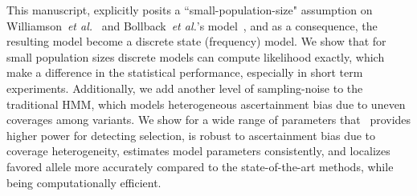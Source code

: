 This manuscript, explicitly posits a ``small-population-size" assumption on 
Williamson~\emph{et al.}~\cite{williamson1999using} and Bollback~\emph{et 
al.}'s model~\cite{bollback2008estimation}, and as a consequence, the 
resulting model become a discrete state (frequency) model. 
We show that for small population sizes discrete models can compute 
likelihood exactly, which make a difference in the statistical performance, 
especially in short term 
experiments. Additionally, we add another level of sampling-noise to the 
traditional HMM, which models heterogeneous ascertainment bias due to 
uneven coverages among variants. We show for a wide range of parameters
that \comale\ provides higher power for detecting selection, is robust
to ascertainment bias due to coverage heterogeneity, estimates model
parameters consistently, and localizes favored allele more accurately
compared to the state-of-the-art methods, while being computationally 
efficient.
